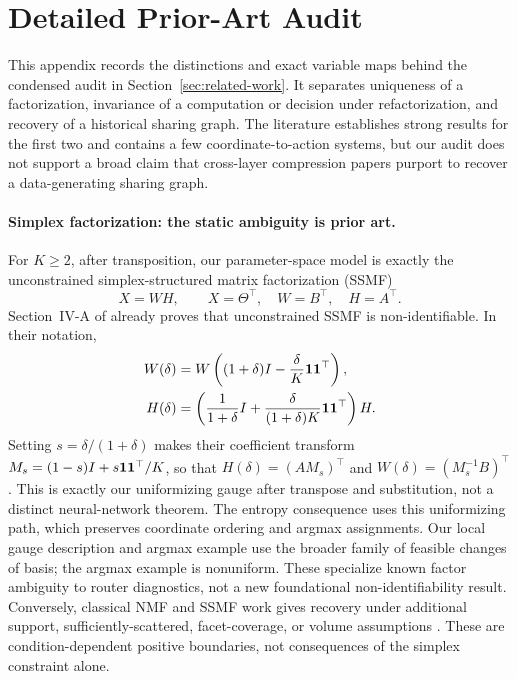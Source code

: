 \section{Detailed Prior-Art Audit}
\label{app:literature}

This appendix records the distinctions and exact variable maps behind the
condensed audit in Section~\ref{sec:related-work}.  It separates uniqueness of
a factorization, invariance of a computation or decision under
refactorization, and recovery of a historical sharing graph.  The literature
establishes strong results for the first two and contains a few
coordinate-to-action systems, but our audit does not support a broad claim
that cross-layer compression papers purport to recover a data-generating
sharing graph.

\paragraph{Simplex factorization: the static ambiguity is prior art.}
For \(K\ge 2\), after transposition, our parameter-space model is exactly the unconstrained
simplex-structured matrix factorization (SSMF)
\[
 X=WH,\qquad X=\Theta^\top,\quad W=B^\top,\quad H=A^\top.
\]
Section~IV-A of \citet{vuthanh2023bounded} already proves that unconstrained
SSMF is non-identifiable.  In their notation,
\begin{align*}
 W(\delta)&=W\left((1+\delta)I-\frac{\delta}{K}\mathbf{1}\mathbf{1}^\top\right),\\
 H(\delta)&=\left(\frac{1}{1+\delta}I+
 \frac{\delta}{(1+\delta)K}\mathbf{1}\mathbf{1}^\top\right)H.
\end{align*}
Setting $s=\delta/(1+\delta)$ makes their coefficient transform
$M_s=(1-s)I+s\mathbf{1}\mathbf{1}^\top/K$, so that
$H(\delta)=(AM_s)^\top$ and
$W(\delta)=(M_s^{-1}B)^\top$.  This is exactly our uniformizing gauge after
transpose and substitution, not a distinct neural-network theorem.  The entropy consequence uses this uniformizing path, which preserves
coordinate ordering and argmax assignments. Our local gauge description
and argmax example use the broader family of feasible changes of basis;
the argmax example is nonuniform. These specialize known factor ambiguity
to router diagnostics, not a new foundational non-identifiability result.  Conversely, classical NMF and SSMF
work gives recovery under additional support, sufficiently-scattered,
facet-coverage, or volume assumptions
\citep{donoho2003correct,fu2018identifiability,abdolali2021simplex,gillis2023partial}.
These are condition-dependent positive boundaries, not consequences of the
simplex constraint alone.

